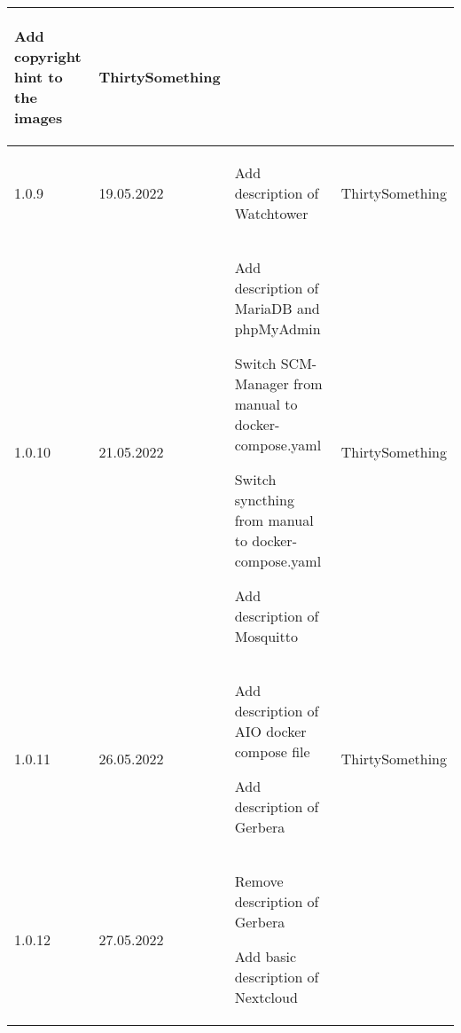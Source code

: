 \begin{tiny}
\begin{longtable}{ | p{} | p{} | P{0.49\textwidth} | p{0.15\textwidth} | }
\begin{tsLTItemize}
            \item Add copyright hint to the images
        \end{tsLTItemize}
                                 &
        ThirtySomething            \\
        \hline
        1.0.9                    &
        19.05.2022               &
        \begin{tsLTItemize}
            \item Add description of Watchtower
        \end{tsLTItemize}
                                 &
        ThirtySomething            \\
        \hline
        1.0.10                   &
        21.05.2022               &
        \begin{tsLTItemize}
            \item Add description of MariaDB and phpMyAdmin
            \item Switch SCM-Manager from manual to docker-compose.yaml
            \item Switch syncthing from manual to docker-compose.yaml
            \item Add description of Mosquitto
        \end{tsLTItemize}
                                 &
        ThirtySomething            \\
        \hline
        1.0.11                   &
        26.05.2022               &
        \begin{tsLTItemize}
            \item Add description of AIO docker compose file
            \item Add description of Gerbera
        \end{tsLTItemize}
                                 &
        ThirtySomething            \\
        \hline
        1.0.12                   &
        27.05.2022               &
        \begin{tsLTItemize}
            \item Remove description of Gerbera
            \item Add basic description of Nextcloud

\end{tsLTItemize}
\end{longtable}
\end{tiny}
